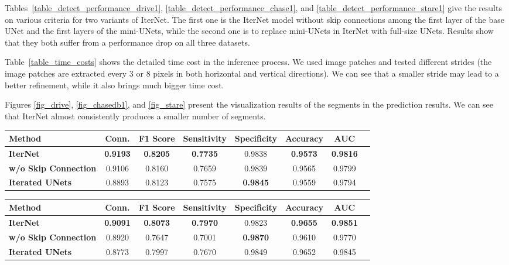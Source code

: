 \documentclass[10pt,twocolumn,letterpaper]{article}
\begin{document}
Tables~\ref{table_detect_performance_drive1}, \ref{table_detect_performance_chase1}, and \ref{table_detect_performance_stare1} give the results on various criteria for two variants of IterNet. The first one is the IterNet model without skip connections among the first layer of the base UNet and the first layers of the mini-UNets, while the second one is to replace mini-UNets in IterNet with full-size UNets. Results show that they both suffer from a performance drop on all three datasets.

Table~\ref{table_time_costs} shows the detailed time cost in the inference process. We used  image patches and tested different strides (the image patches are extracted every 3 or 8 pixels in both horizontal and vertical directions). We can see that a smaller stride may lead to a better refinement, while it also brings much bigger time cost.

Figures \ref{fig_drive}, \ref{fig_chasedb1}, and \ref{fig_stare} present the visualization results of the segments in the prediction results. We can see that IterNet almost consistently produces a smaller number of segments. 


\newpage


\begin{table*}
	\caption{Performance comparison on the DRIVE dataset (with mask).}
	\label{table_detect_performance_drive1}
	\centering
	\begin{tabular}{l|ccccccc}
		\hline
		Method  & Conn. & F1 Score & Sensitivity & Specificity & Accuracy & AUC\\ 
		\hline
		
		\textbf{IterNet} & \textbf{0.9193} &\textbf{0.8205} & \textbf{0.7735} & 0.9838 &\textbf{0.9573}& \textbf{0.9816}\\
		\textbf{w/o Skip Connection} & 0.9106 & 0.8160 & 0.7659 &  0.9839& 0.9565& 0.9799\\
		\textbf{Iterated UNets } & 0.8893 & 0.8123 & 0.7575 & \textbf{0.9845} & 0.9559& 0.9794\\
		
		\hline
	\end{tabular}
\end{table*}

\begin{table*}
	\caption{Performance comparison on the CHASEDB1 dataset (with mask).}
	\label{table_detect_performance_chase1}
	\centering
	\begin{tabular}{l|ccccccc}
		\hline
		Method  & Conn. & F1 Score & Sensitivity & Specificity & Accuracy & AUC\\ 
		\hline
		
		\textbf{IterNet} & \textbf{0.9091} &  \textbf{0.8073} &  \textbf{0.7970} & 0.9823 & \textbf{0.9655} & \textbf{0.9851}\\
		\textbf{w/o Skip Connection} & 0.8920 & 0.7647 & 0.7001 & \textbf{0.9870} & 0.9610 & 0.9770\\
		\textbf{Iterated UNets } & 0.8773 & 0.7997 & 0.7670 & 0.9849 & 0.9652 & 0.9845\\
		
		\hline
	\end{tabular}
\end{table*}
\end{document}
